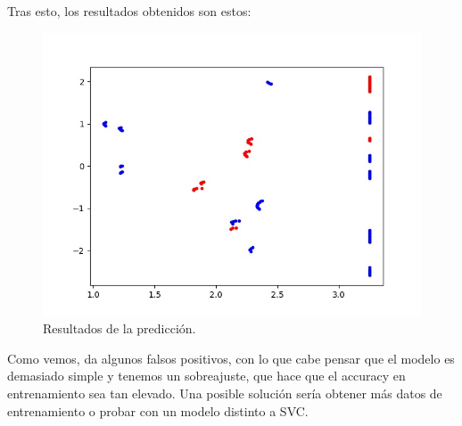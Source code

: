 \documentclass[12pt, spanish]{article}
\begin{document}
Tras esto, los resultados obtenidos son estos:

\begin{figure}[H]
    \centering
    \includegraphics[width=\textwidth]{capturaTest.jpg}
    \caption{Resultados de la predicción.}
\end{figure}

Como vemos, da algunos falsos positivos, con lo que cabe pensar que el modelo es demasiado simple y tenemos un sobreajuste, que hace que el accuracy en entrenamiento sea tan elevado. Una posible solución sería obtener más datos de entrenamiento o probar con un modelo distinto a SVC.

%
%
\end{document}
